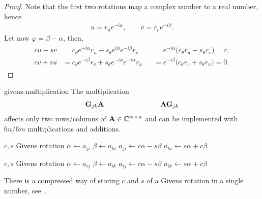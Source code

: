 \begin{proof}
  Note that the first two rotations map a complex number to a real number, hence
  \begin{gather}
    u = r_u e^{-i\alpha}, \qquad v = r_v e^{-i\beta}.
  \end{gather}
  Let now $\varphi = \beta-\alpha$, then,
  \begin{gather}
    \begin{aligned}
      c u - s v
      &= c_\theta e^{-i\alpha} r_u - s_\theta e^{i\phi} e^{-i\beta} r_v
      &&= e^{-i\alpha}\bigl(c_\theta r_u - s_\theta r_v\bigr) = r,
      \\
      c v + \overline s u
      &= c_\theta e^{-i\beta} r_v + s_\theta e^{-i\phi} e^{-i\alpha} r_u
      &&= e^{-i\beta}\bigl(c_\theta r_v + s_\theta r_u\bigr) = 0.      
    \end{aligned}
  \end{gather}
\end{proof}

\begin{Algorithm}{givens-multiplication}
  The multiplication
  \begin{gather}
    \mathbf G_{jk}\mathbf A\qquad\qquad\qquad\qquad \mathbf A\mathbf G_{jk}
  \end{gather}
  affects only two rows/columns of $\mathbf A\in\mathbb C^{m\times n}$ and can be
  implemented with $6n/6m$ multiplications and additions.

  \hrulefill
  \vspace*{2mm}
  
  \begin{minipage}{.49\textwidth}
    \begin{algorithmic}[1]
      \Require $c,s$ Givens rotation
      \State $\alpha \gets a_{ji}$
      \State $\beta \gets a_{ki}$
      \State $a_{ji} \gets c\alpha-s\beta$
      \State $a_{ki} \gets s\alpha+c\beta$
      \EndFor
    \end{algorithmic}      
  \end{minipage}
  \begin{minipage}{.49\textwidth}
    \begin{algorithmic}[1]
      \Require $c,s$ Givens rotation
      \State $\alpha \gets a_{ij}$
      \State $\beta \gets a_{ik}$
      \State $a_{ij} \gets c\alpha-s\beta$
      \State $a_{ik} \gets s\alpha+c\beta$
      \EndFor
    \end{algorithmic}      
  \end{minipage}
\end{Algorithm}

\begin{remark}
  There is a compressed way of storing $c$ and $s$ of a Givens rotation in a single number, see~\cite[5.1.11]{GolubVanLoan83}.
\end{remark}



